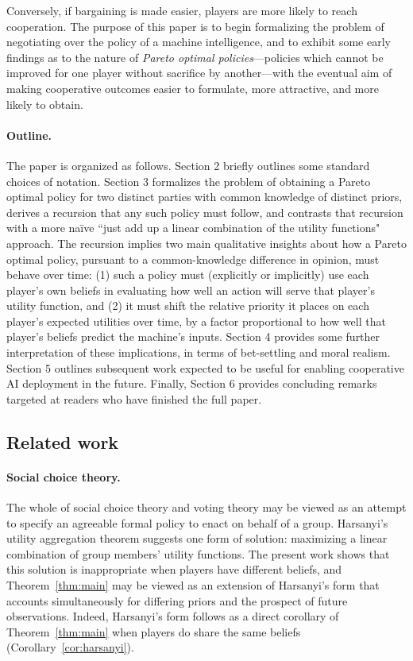 \documentclass{article}
\newcommand{\thm}[1]{Theorem~\ref{thm:#1}}
\newcommand{\cor}[1]{Corollary~\ref{cor:#1}}
\begin{document}
Conversely, if bargaining is made easier, players are more likely to reach cooperation.  The purpose of this paper is to begin formalizing the problem of negotiating over the policy of a machine intelligence, and to exhibit some early findings as to the nature of \emph{Pareto optimal policies}---policies which cannot be improved for one player without sacrifice by another---with the eventual aim of making cooperative outcomes easier to formulate, more attractive, and more likely to obtain.

\paragraph{Outline.} The paper is organized as follows.  Section 2 briefly outlines some standard choices of notation.  Section 3 formalizes the problem of obtaining a Pareto optimal policy for two distinct parties with common knowledge of distinct priors, derives a recursion that any such policy must follow, and contrasts that recursion with a more na\"{i}ve ``just add up a linear combination of the utility functions" approach.  The recursion implies two main qualitative insights about how a Pareto optimal policy, pursuant to a common-knowledge difference in opinion, must behave over time: (1) such a policy must (explicitly or implicitly) use each player's own beliefs in evaluating how well an action will serve that player's utility function, and (2) it must shift the relative priority it places on each player's expected utilities over time, by a factor proportional to how well that player's beliefs predict the machine's inputs.  Section 4 provides some further interpretation of these implications, in terms of bet-settling and moral realism.  Section 5 outlines subsequent work expected to be useful for enabling cooperative AI deployment in the future.  Finally, Section 6 provides concluding remarks targeted at readers who have finished the full paper.

\subsection{Related work}

\paragraph{Social choice theory.} The whole of social choice theory and voting theory may be viewed as an attempt to specify an agreeable formal policy to enact on behalf of a group.  Harsanyi's utility aggregation theorem \citep{harsanyi1980cardinal} suggests one form of solution: maximizing a linear combination of group members' utility functions.  The present work shows that this solution is inappropriate when players have different beliefs, and \thm{main} may be viewed as an extension of Harsanyi's form that accounts simultaneously for differing priors and the prospect of future observations.  Indeed, Harsanyi's form follows as a direct corollary of \thm{main} when players do share the same beliefs (\cor{harsanyi}).
\end{document}

